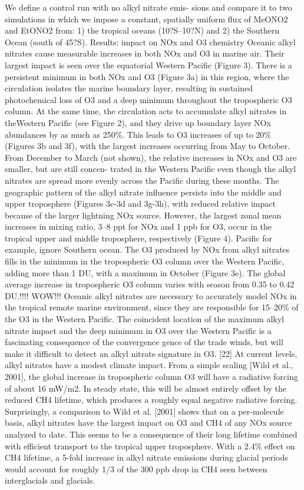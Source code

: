 \documentclass[11pt,a4paper]{article}
\begin{document}
We define a control run with no alkyl nitrate emis-
sions and compare it to two simulations in which we impose a constant, spatially uniform flux of MeONO2 and EtONO2 from: 1) the tropical oceans (10?S–10?N) and 2) the Southern Ocean (south of 45?S).
Results: impact on NOx and O3 chemistry
Oceanic alkyl nitrates cause measurable increases in
both NOx and O3 in marine air. Their largest impact is seen over the equatorial Western Pacific (Figure 3). There is a persistent minimum in both NOx and O3 (Figure 3a) in this region, where the circulation isolates the marine boundary layer, resulting in sustained photochemical loss of O3 and a deep minimum throughout the tropospheric O3 column. At the same time, the circulation acts to accumulate alkyl nitrates in theWestern Pacific (see Figure 2), and they drive up boundary layer NOx abundances by as much as 250\%. This leads to O3 increases of up to 20\% (Figures 3b and 3f), with the largest increases occurring from May to October. From December to March (not shown), the relative increases in NOx and O3 are smaller, but are still concen- trated in the Western Pacific even though the alkyl nitrates are spread more evenly across the Pacific during these months. The geographic pattern of the alkyl nitrate influence persists into the middle and upper troposphere (Figures 3c-3d and 3g-3h), with reduced relative impact because of the larger lightning NOx source. However, the largest zonal mean increases in mixing ratio, 3–8 ppt for NOx and 1 ppb for O3, occur in the tropical upper and middle troposphere, respectively (Figure 4).
Pacific for example, ignore Southern ocean.
The O3 produced by NOx from alkyl nitrates fills in
the minimum in the tropospheric O3 column over the Western Pacific, adding more than 1 DU, with a maximum in October (Figure 3e). The global average increase in tropospheric O3 column varies with season from 0.35 to 0.42 DU.!!!!
WOW!!!
Oceanic alkyl nitrates are necessary to accurately
model NOx in the tropical remote marine environment, since they are responsible for 15–20\% of the O3 in the Western Pacific. The coincident location of the maximum alkyl nitrate impact and the deep minimum in O3 over the Western Pacific is a fascinating consequence of the convergence gence of the trade winds, but will make it difficult to detect an alkyl nitrate signature in O3. [22] At current levels, alkyl nitrates have a modest climate impact. From a simple scaling [Wild et al., 2001], the global increase in tropospheric column O3 will have a radiative forcing of about 16 mW/m2. In steady state, this will be almost entirely offset by the reduced CH4 lifetime, which produces a roughly equal negative radiative forcing. Surprisingly, a comparison to Wild et al. [2001] shows that on a per-molecule basis, alkyl nitrates have the largest impact on O3 and CH4 of any NOx source analyzed to date. This seems to be a consequence of their long lifetime combined with efficient transport to the tropical upper troposphere. With a 2.4\% effect on CH4 lifetime, a 5-fold increase in alkyl nitrate emissions during glacial periods would account for roughly 1/3 of the 300 ppb drop in CH4 seen between interglacials and glacials.
\end{document}
